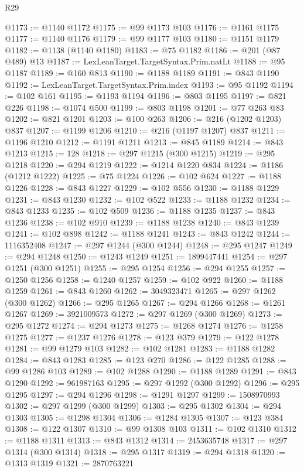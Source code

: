 \begin{lexlean}{R29}
\begin{coremodule}
@1173 := @1140 @1172
@1175 := @99 @1173 @103
@1176 := @1161 @1175
@1177 := @1140 @1176
@1179 := @99 @1177 @103
@1180 := @1151 @1179
@1182 := @1138 (@1140 @1180)
@1183 := @75 @1182
@1186 := @201 (@87 @489) @13
@1187 := LexLeanTarget.TargetSyntax.Prim.natLt
@1188 := @95 @1187
@1189 := @160 @813
@1190 := @1188 @1189
@1191 := @843 @1190
@1192 := LexLeanTarget.TargetSyntax.Prim.index
@1193 := @95 @1192
@1194 := @102 @161
@1195 := @1193 @1194
@1196 := @803 @1195
@1197 := @821 @226
@1198 := @1074 @500
@1199 := @803 @1198
@1201 := @77 @263 @83
@1202 := @821 @1201
@1203 := @100 @263
@1206 := @216 (@1202 @1203) @837
@1207 := @1199 @1206
@1210 := @216 (@1197 @1207) @837
@1211 := @1196 @1210
@1212 := @1191 @1211
@1213 := @845 @1189
@1214 := @843 @1213
@1215 := 128
@1218 := @297 @1215 (@300 @1215)
@1219 := @295 @1218
@1220 := @294 @1219
@1222 := @1214 @1220 @834
@1224 := @1186 (@1212 @1222)
@1225 := @75 @1224
@1226 := @102 @624
@1227 := @1188 @1226
@1228 := @843 @1227
@1229 := @102 @556
@1230 := @1188 @1229
@1231 := @843 @1230
@1232 := @102 @522
@1233 := @1188 @1232
@1234 := @843 @1233
@1235 := @102 @509
@1236 := @1188 @1235
@1237 := @843 @1236
@1238 := @102 @910
@1239 := @1188 @1238
@1240 := @843 @1239
@1241 := @102 @898
@1242 := @1188 @1241
@1243 := @843 @1242
@1244 := 1116352408
@1247 := @297 @1244 (@300 @1244)
@1248 := @295 @1247
@1249 := @294 @1248
@1250 := @1243 @1249
@1251 := 1899447441
@1254 := @297 @1251 (@300 @1251)
@1255 := @295 @1254
@1256 := @294 @1255
@1257 := @1250 @1256
@1258 := @1240 @1257
@1259 := @102 @922
@1260 := @1188 @1259
@1261 := @843 @1260
@1262 := 3049323471
@1265 := @297 @1262 (@300 @1262)
@1266 := @295 @1265
@1267 := @294 @1266
@1268 := @1261 @1267
@1269 := 3921009573
@1272 := @297 @1269 (@300 @1269)
@1273 := @295 @1272
@1274 := @294 @1273
@1275 := @1268 @1274
@1276 := @1258 @1275
@1277 := @1237 @1276
@1278 := @123 @379
@1279 := @122 @1278
@1281 := @99 @1279 @103
@1282 := @102 @1281
@1283 := @1188 @1282
@1284 := @843 @1283
@1285 := @123 @270
@1286 := @122 @1285
@1288 := @99 @1286 @103
@1289 := @102 @1288
@1290 := @1188 @1289
@1291 := @843 @1290
@1292 := 961987163
@1295 := @297 @1292 (@300 @1292)
@1296 := @295 @1295
@1297 := @294 @1296
@1298 := @1291 @1297
@1299 := 1508970993
@1302 := @297 @1299 (@300 @1299)
@1303 := @295 @1302
@1304 := @294 @1303
@1305 := @1298 @1304
@1306 := @1284 @1305
@1307 := @123 @384
@1308 := @122 @1307
@1310 := @99 @1308 @103
@1311 := @102 @1310
@1312 := @1188 @1311
@1313 := @843 @1312
@1314 := 2453635748
@1317 := @297 @1314 (@300 @1314)
@1318 := @295 @1317
@1319 := @294 @1318
@1320 := @1313 @1319
@1321 := 2870763221

\end{coremodule}
\end{lexlean}
